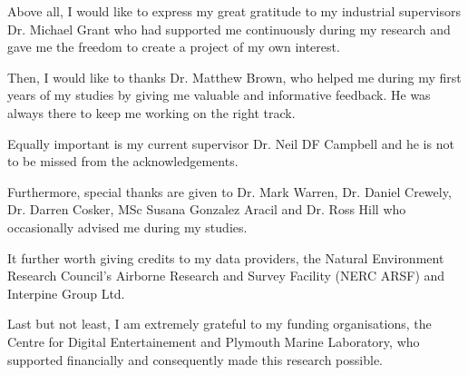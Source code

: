 \documentclass{subfiles}
\begin{document}
	\par Above all, I would like to express my great gratitude to my industrial supervisors Dr. Michael Grant who had supported me continuously during my research and gave me the freedom to create a project of my own interest.
	
	\par Then, I would like to thanks Dr. Matthew Brown, who helped me during my first years of my studies by giving me valuable and informative feedback. He was always there to keep me working on the right track. 
	
	\par Equally important is my current supervisor Dr. Neil DF Campbell and he is not to be missed from the acknowledgements.
	
	\par Furthermore, special thanks are given to Dr. Mark Warren, Dr. Daniel Crewely, Dr. Darren Cosker, MSc Susana Gonzalez Aracil and Dr. Ross Hill who occasionally advised me during my studies. 
	
	\par It further worth giving credits to my data providers, the Natural Environment Research Council’s Airborne Research and Survey Facility (NERC ARSF) and Interpine Group Ltd. 
	
	\par Last but not least, I am extremely grateful to my funding organisations, the Centre for Digital Entertainement and Plymouth Marine Laboratory, who supported financially and consequently made this research possible. 
	

	
\end{document}
